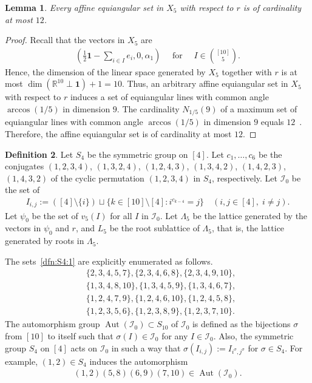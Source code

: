 \documentclass[reqno, 11pt]{amsart}
\numberwithin{equation}{section}
\newtheorem{lem}{Lemma}[section]
\theoremstyle{definition}
\newtheorem{dfn}[lem]{Definition}%
\DeclareMathOperator{\Aut}{Aut}
\newcommand{\cI}{\mathcal{I}}
\newcommand{\aesf}{\psi}
\newcommand{\R}{\mathbb{R}}
\newcommand{\allone}{\mathbf{1}}
\newcommand{\sr}{ r } %
\begin{document}
\begin{lem}	\label{lem:12}
	Every affine equiangular set in $X_5$ with respect to $\sr$ is of cardinality at most $12$.
\end{lem}
\begin{proof}
	Recall that the vectors in $X_5$ are
	\begin{align*}
		\left(\frac{1}{2}\allone-\sum_{i\in I}e_i,0,\alpha_1 \right) \quad \text{ for } \quad I\in\binom{[10]}{5}.
	\end{align*}
	Hence, the dimension of the linear space generated by $X_5$ together with $\sr$ is at most $\dim(\R^{10} \perp \allone) + 1 = 10$.
	Thus, an arbitrary affine equiangular set in $X_5$ with respect to $\sr$ induces a set of equiangular lines with common angle $\arccos(1/5)$ in dimension $9$.
	The cardinality $N_{1/5}(9)$ of a maximum set of equiangular lines with common angle $\arccos(1/5)$ in dimension $9$ equals $12$~\cite[Theorem~6.7 (with a computer)]{GKMS}.
	Therefore, the affine equiangular set is of cardinality at most $12$.
\end{proof}

\begin{dfn}	\label{dfn:S4}
	Let $S_4$ be the symmetric group on $[4]$.
	Let $c_1,\ldots,c_6$ be the conjugates
	$
		(1, 2, 3, 4)$, $
		(1, 3, 2, 4)$, $
		(1, 2, 4, 3)$, $
		(1, 3, 4, 2)$, $
		(1, 4, 2, 3)$, $
		(1, 4, 3, 2)
	$
	of the cyclic permutation $(1,2,3,4)$ in $S_4$,
	respectively.
	Let $\cI_0$ be the set of
	\begin{align} 	\label{dfn:S4:1}
		I_{i,j} :=  \left( [4] \setminus \{i\} \right) \sqcup \{ k \in [10] \setminus [4] : i^{c_{k-4}} = j \}
		\quad (i,j \in [4],\;i\neq j ).
	\end{align}
	Let $\aesf_0$ be the set of $v_5(I)$ for all $I$ in $\cI_0$.
	Let $\Lambda_5$ be the lattice generated by the vectors in $\aesf_0$ and $\sr$,
	and $L_5$ be the root sublattice of $\Lambda_5$,
	that is, the lattice generated by roots in $\Lambda_5$.
\end{dfn}

The sets~\eqref{dfn:S4:1} are explicitly enumerated as follows.
\begin{align*}
	 & \{ 2, 3, 4, 5, 7 \},
	\{ 2, 3, 4, 6, 8 \},
	\{ 2, 3, 4, 9, 10 \},    \\
	 & \{ 1, 3, 4, 8, 10 \},
	\{ 1, 3, 4, 5, 9 \},
	\{ 1, 3, 4, 6, 7 \},     \\
	 & \{ 1, 2, 4, 7, 9 \},
	\{ 1, 2, 4, 6, 10 \},
	\{ 1, 2, 4, 5, 8 \},     \\
	 & \{ 1, 2, 3, 5, 6 \},
	\{ 1, 2, 3, 8, 9 \},
	\{ 1, 2, 3, 7, 10 \}.
\end{align*}
The automorphism group $\Aut(\cI_0) \subset S_{10}$ of $\cI_0$ is defined as the bijections $\sigma$ from $[10]$ to itself such that $\sigma(I) \in \cI_0$ for any $I \in \cI_0$.
Also, the symmetric group $S_4$ on $[4]$ acts on $\cI_0$ in such a way that $\sigma(I_{i,j}) := I_{i^\sigma, j^\sigma}$ for $\sigma \in S_4$.
For example, $(1,2) \in S_4$ induces the automorphism 
\begin{align}	\label{Aut(I_0)}
	(1,2)(5,8)(6,9)(7,10) \in \Aut(\cI_0).
\end{align}
\end{document}
